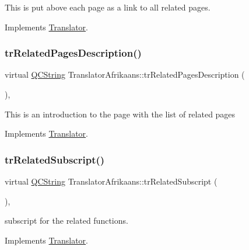 This is put above each page as a link to all related pages. 

Implements \mbox{\hyperlink{class_translator}{Translator}}.

\mbox{\label{class_translator_afrikaans_a16ead21190326605dd2665d619e05620}} 
\subsubsection{\texorpdfstring{trRelatedPagesDescription()}{trRelatedPagesDescription()}}
{\footnotesize\ttfamily virtual \mbox{\hyperlink{class_q_c_string}{Q\+C\+String}} Translator\+Afrikaans\+::tr\+Related\+Pages\+Description (\begin{DoxyParamCaption}{ }\end{DoxyParamCaption})\hspace{0.3cm}{\ttfamily [inline]}, {\ttfamily [virtual]}}

This is an introduction to the page with the list of related pages 

Implements \mbox{\hyperlink{class_translator}{Translator}}.

\mbox{\label{class_translator_afrikaans_a6f297f2ed14990f1ff093b1a401206bc}} 
\subsubsection{\texorpdfstring{trRelatedSubscript()}{trRelatedSubscript()}}
{\footnotesize\ttfamily virtual \mbox{\hyperlink{class_q_c_string}{Q\+C\+String}} Translator\+Afrikaans\+::tr\+Related\+Subscript (\begin{DoxyParamCaption}{ }\end{DoxyParamCaption})\hspace{0.3cm}{\ttfamily [inline]}, {\ttfamily [virtual]}}

subscript for the related functions. 

Implements \mbox{\hyperlink{class_translator}{Translator}}.

\mbox{\label{class_translator_afrikaans_a855fcec8cae7e3b6cd9ce8ed0d1d8994}} 
